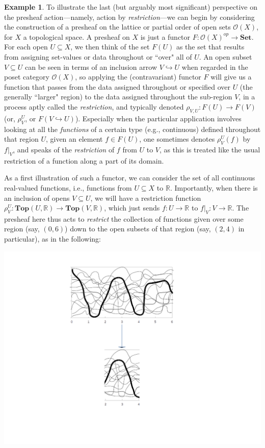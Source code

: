 \documentclass[a4paper]{book}
\theoremstyle{definition}
\newtheorem{example}{Example}[section]
\theoremstyle{definition}
\theoremstyle{definition}
\theoremstyle{theorem}
\theoremstyle{definition}
\begin{document}
	\begin{example}
		To illustrate the last (but arguably most significant) perspective on the presheaf action---namely, action by \textit{restriction}---we can begin by considering the construction of a presheaf on the lattice or partial order of open sets $\mathscr{O}(X)$, for $X$ a topological space. A presheaf on $X$ is just a functor $F: \mathscr{O}(X)^{op} \rightarrow \textbf{Set}$. For each open $U \subseteq  X$, we then think of the set $F(U)$ as the set that results from assigning set-values or data throughout or ``over" all of $U$. An open subset $V \subseteq  U$ can be seen in terms of an inclusion arrow $V \hookrightarrow U$ when regarded in the poset category $\mathscr{O}(X)$, so applying the (contravariant) functor $F$ will give us a function that passes from the data assigned throughout or specified over $U$ (the generally ``larger" region) to the data assigned throughout the sub-region $V$, in a process aptly called the \textit{restriction}, and typically denoted $\rho_{V,U}: F(U) \rightarrow F(V)$ (or, $\rho^U_V$, or $F(V \hookrightarrow U)$). Especially when the particular application involves looking at all the \textit{functions} of a certain type (e.g., continuous) defined throughout that region $U$, given an element $f \in F(U)$, one sometimes denotes $\rho^{U}_V(f)$ by $f|_V$, and speaks of the \textit{restriction} of $f$ from $U$ to $V$, as this is treated like the usual restriction of a function along a part of its domain. \par 
		As a first illustration of such a functor, we can consider the set of all continuous real-valued functions, i.e., functions from $U \subseteq  X$ to $\mathbb{R}$. Importantly, when there is an inclusion of opens $V \subseteq  U$, we will have a restriction function $\rho^U_V: \textbf{Top}(U, \mathbb{R}) \rightarrow \textbf{Top}(V, \mathbb{R})$, which just sends $f: U \rightarrow \mathbb{R}$ to $f|_V: V \rightarrow \mathbb{R}$. The presheaf here thus acts to \textit{restrict} the collection of functions given over some region (say, $(0,6)$) down to the open subsets of that region (say, $(2,4)$ in particular), as in the following:
		\begin{center}
			\includegraphics[scale=0.5]{RealAlgebraSheaf.png}

\end{center}
\end{example}
\end{document}
